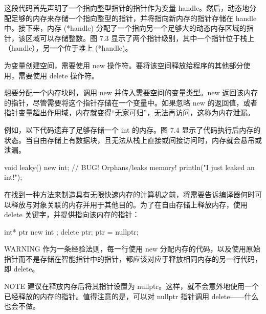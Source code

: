 这段代码首先声明了一个指向整型指针的指针作为变量 handle。然后，动态地分配足够的内存来存储一个指向整型的指针，并将指向新内存的指针存储在 handle 中。接下来，内存 (*handle) 分配了一个指向另一个足够大的动态内存区域的指针，该区域可以存储整数。图 7.3 显示了两个指针级别，其中一个指针位于栈上（handle），另一个位于堆上 (*handle)。



为变量创建空间，需要使用 new 操作符。要将该空间释放给程序的其他部分使用，需要使用 delete 操作符。


想要分配一个内存块时，调用 new 并传入需要空间的变量类型。new 返回该内存的指针，尽管需要将这个指针存储在一个变量中。如果忽略 new 的返回值，或者指针变量超出作用域，内存就变得“无家可归”，无法再访问，这称为内存泄漏。

例如，以下代码遗弃了足够存储一个 int 的内存。图 7.4 显示了代码执行后内存的状态。当自由存储上有数据块，且无法从栈上直接或间接访问时，内存就会悬吊或泄漏。


\begin{cpp}
void leaky()
{
    new int; // BUG! Orphans/leaks memory!
    println("I just leaked an int!");
}
\end{cpp}

在找到一种方法来制造具有无限快速内存的计算机之前，将需要告诉编译器何时可以释放与对象关联的内存并用于其他目的。为了在自由存储上释放内存，使用 delete 关键字，并提供指向该内存的指针：

\begin{cpp}
int* ptr { new int };
delete ptr;
ptr = nullptr;
\end{cpp}

\begin{myWarning}{WARNING}
作为一条经验法则，每一行使用 new 分配内存的代码，以及使用原始指针而不是存储在智能指针中的指针，都应该对应于释放相同内存的另一行代码，即 delete。
\end{myWarning}

\begin{myNotic}{NOTE}
建议在释放内存后将其指针设置为 nullptr。这样，就不会意外地使用一个已经释放的内存的指针。值得注意的是，可以对 nullptr 指针调用 delete——什么也会不做。
\end{myNotic}


